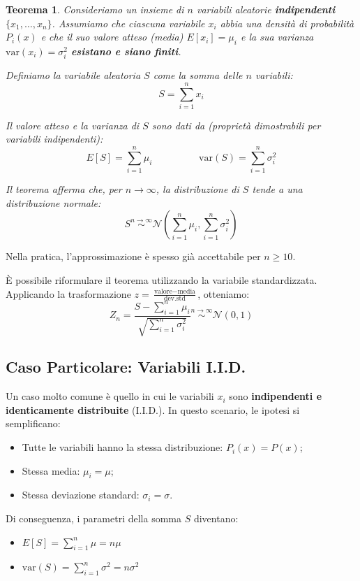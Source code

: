 \documentclass[openany,a4paper,12pt]{book}
\newtheorem*{theorem*}{Teorema}
\theoremstyle{remark}
\begin{document}
\begin{theorem*}
    Consideriamo un insieme di $n$ variabili aleatorie \textbf{indipendenti} $\{x_1, \dots, x_n\}$.
    Assumiamo che ciascuna variabile $x_i$ abbia una densità di probabilità $P_i(x)$ e che il suo valore atteso (media) $E[x_i]=\mu_i$ e la sua varianza $\text{var}(x_i)=\sigma_i^2$ \textbf{esistano e siano finiti}.

    Definiamo la variabile aleatoria $S$ come la somma delle $n$ variabili:
    \[
    S = \sum_{i=1}^{n} x_i
    \]
    
    Il valore atteso e la varianza di $S$ sono dati da (proprietà dimostrabili per variabili indipendenti):
    \[
    E[S] = \sum_{i=1}^{n} \mu_i \hspace{2cm} \text{var}(S) = \sum_{i=1}^{n} \sigma_i^2
    \]
    
    Il teorema afferma che, per $n \to \infty$, la distribuzione di $S$ tende a una distribuzione normale:
    \[
    S \overset{n \to \infty}{\sim} \mathcal{N} \left(\sum_{i=1}^{n} \mu_i, \sum_{i=1}^{n} \sigma_i^2 \right)
    \]
\end{theorem*}

Nella pratica, l'approssimazione è spesso già accettabile per $n \ge 10$.

È possibile riformulare il teorema utilizzando la variabile standardizzata. Applicando la trasformazione $z = \frac{\text{valore} - \text{media}}{\text{dev.std}}$, otteniamo:
\[
Z_n = \frac{S - \sum_{i=1}^{n} \mu_i}{\sqrt{\sum_{i=1}^{n} \sigma_i^2}} \overset{n \to \infty}{\sim} \mathcal{N}(0,1)
\]

\subsection*{Caso Particolare: Variabili I.I.D.}
Un caso molto comune è quello in cui le variabili $x_i$ sono \textbf{indipendenti e identicamente distribuite} (I.I.D.). In questo scenario, le ipotesi si semplificano:
\begin{itemize}
    \item Tutte le variabili hanno la stessa distribuzione: $P_i(x) = P(x)$;
    \item Stessa media: $\mu_i = \mu$;
    \item Stessa deviazione standard: $\sigma_i = \sigma$.
\end{itemize}

Di conseguenza, i parametri della somma $S$ diventano:
\begin{itemize}
    \item $E[S] = \sum_{i=1}^n \mu = n\mu$
    \item $\text{var}(S) = \sum_{i=1}^n \sigma^2 = n\sigma^2$
\end{itemize}
\end{document}
